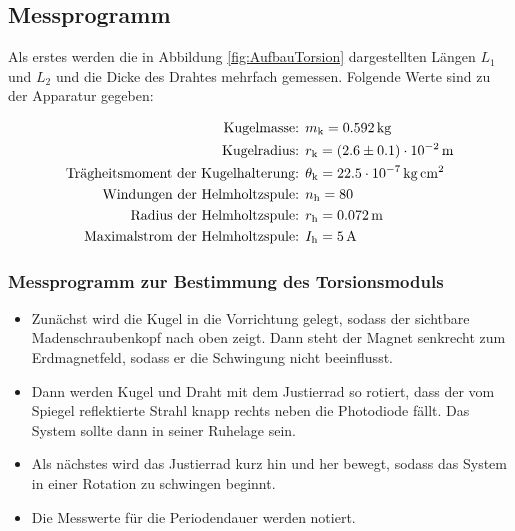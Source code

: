 \subsection{Messprogramm}

Als erstes werden die in Abbildung \ref{fig:AufbauTorsion} dargestellten Längen
$L_1$ und $L_2$ und die Dicke des Drahtes mehrfach gemessen.
Folgende Werte sind zu der Apparatur gegeben:

\begin{align}
  \text{Kugelmasse: } & m_\text{k} = \SI{0.59{2}}{\kilo\gram} \\
  \text{Kugelradius: } & r_\text{k} = \SI{2.6(1)e-2}{\meter} \\
  \text{Trägheitsmoment der Kugelhalterung: } & \theta_\text{k} = \SI{22.5
  e-7}{\kilo\gram\centi\meter\squared} \\
  \text{Windungen der Helmholtzspule: } & n_\text{h} = 80 \\
  \text{Radius der Helmholtzspule: } & r_\text{h} = \SI{0.072}{\meter} \\
  \text{Maximalstrom der Helmholtzspule: } & I_\text{h} = \SI{5}{\ampere} \\
\end{align}

\subsubsection{Messprogramm zur Bestimmung des Torsionsmoduls}
\label{sec:MessTorsion}

\begin{itemize}

  \item Zunächst wird die Kugel in die Vorrichtung gelegt, sodass der
  sichtbare Madenschraubenkopf nach oben zeigt. Dann steht der Magnet
  senkrecht zum Erdmagnetfeld, sodass er die Schwingung nicht beeinflusst.

  \item Dann werden Kugel und Draht mit dem Justierrad so rotiert,
  dass der vom Spiegel reflektierte Strahl knapp rechts neben die Photodiode
  fällt. Das System sollte dann in seiner Ruhelage sein.

  \item Als nächstes wird das Justierrad kurz hin und her bewegt, sodass
  das System in einer Rotation zu schwingen beginnt.

  \item Die Messwerte für die Periodendauer werden notiert.

\end{itemize}


